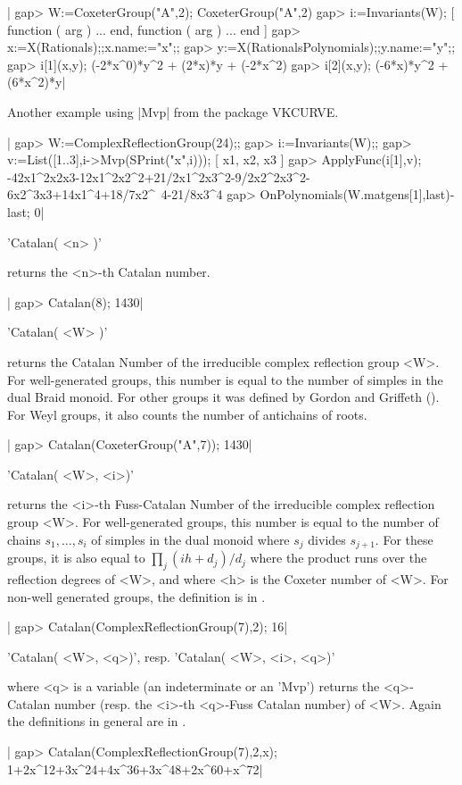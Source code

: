 |    gap> W:=CoxeterGroup("A",2);
    CoxeterGroup("A",2)
    gap> i:=Invariants(W);
    [ function ( arg ) ... end, function ( arg ) ... end ]
    gap> x:=X(Rationals);;x.name:="x";;
    gap> y:=X(RationalsPolynomials);;y.name:="y";;
    gap> i[1](x,y);
    (-2*x^0)*y^2 + (2*x)*y + (-2*x^2)
    gap> i[2](x,y);
    (-6*x)*y^2 + (6*x^2)*y|

Another example using |Mvp| from the package VKCURVE.

|    gap> W:=ComplexReflectionGroup(24);;
    gap> i:=Invariants(W);;
    gap> v:=List([1..3],i->Mvp(SPrint("x",i)));
    [ x1, x2, x3 ]
    gap> ApplyFunc(i[1],v);
    -42x1^2x2x3-12x1^2x2^2+21/2x1^2x3^2-9/2x2^2x3^2-6x2^3x3+14x1^4+18/7x2^\
    4-21/8x3^4
    gap> OnPolynomials(W.matgens[1],last)-last;
    0|

\Section{Catalan}

'Catalan( <n> )'

returns  the <n>-th Catalan number.

|    gap> Catalan(8);
    1430|

'Catalan( <W> )'

returns the Catalan Number of the irreducible complex reflection group <W>.
For well-generated groups, this number is equal to the number of simples in
the  dual  Braid  monoid.  For  other  groups  it was defined by Gordon and
Griffeth  (\cite{gg12}).  For  Weyl  groups,  it  also counts the number of
antichains of roots.

|    gap> Catalan(CoxeterGroup("A",7));
    1430|

'Catalan( <W>, <i>)'

returns   the  <i>-th  Fuss-Catalan  Number   of  the  irreducible  complex
reflection  group <W>. For  well-generated groups, this  number is equal to
the  number of chains $s_1,\ldots,s_i$ of  simples in the dual monoid where
$s_j$   divides  $s_{j+1}$.  For   these  groups,  it   is  also  equal  to
$\prod_j(ih+d_j)/d_j$ where the product runs over the reflection degrees of
<W>,  and where <h>  is the Coxeter  number of <W>.  For non-well generated
groups, the definition is in \cite{gg12}.

|    gap> Catalan(ComplexReflectionGroup(7),2);
    16|

'Catalan( <W>, <q>)', resp. 'Catalan( <W>, <i>, <q>)'

where  <q>  is  a  variable  (an  indeterminate  or  an  'Mvp') returns the
<q>-Catalan number (resp. the <i>-th <q>-Fuss Catalan number) of <W>. Again
the definitions in general are in \cite{gg12}.

|    gap> Catalan(ComplexReflectionGroup(7),2,x);
    1+2x^12+3x^24+4x^36+3x^48+2x^60+x^72|
